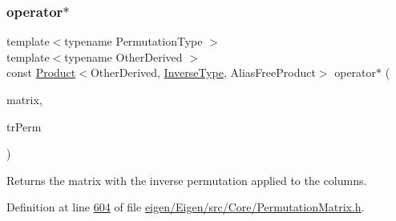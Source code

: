 \subsubsection{\texorpdfstring{operator$\ast$}{operator*}\hspace{0.1cm}{\footnotesize\ttfamily [1/2]}}
{\footnotesize\ttfamily template$<$typename Permutation\+Type $>$ \\
template$<$typename Other\+Derived $>$ \\
const \hyperlink{group___core___module_class_eigen_1_1_product}{Product}$<$Other\+Derived, \hyperlink{class_eigen_1_1_inverse}{Inverse\+Type}, Alias\+Free\+Product$>$ operator$\ast$ (\begin{DoxyParamCaption}\item[{const \hyperlink{group___core___module_class_eigen_1_1_matrix_base}{Matrix\+Base}$<$ Other\+Derived $>$ \&}]{matrix,  }\item[{const \hyperlink{class_eigen_1_1_inverse}{Inverse\+Type} \&}]{tr\+Perm }\end{DoxyParamCaption})\hspace{0.3cm}{\ttfamily [friend]}}

\begin{DoxyReturn}{Returns}
the matrix with the inverse permutation applied to the columns. 
\end{DoxyReturn}


Definition at line \hyperlink{eigen_2_eigen_2src_2_core_2_permutation_matrix_8h_source_l00604}{604} of file \hyperlink{eigen_2_eigen_2src_2_core_2_permutation_matrix_8h_source}{eigen/\+Eigen/src/\+Core/\+Permutation\+Matrix.\+h}.

\mbox{\label{class_eigen_1_1_inverse_impl_3_01_permutation_type_00_01_permutation_storage_01_4_a1d5a5cf25a5052d1b8181587375c853b}} 

